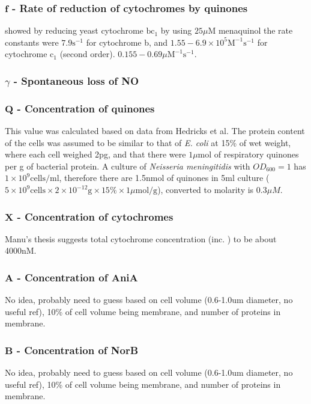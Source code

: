 \subsubsection*{$\mathbf{f}$ {\bf- Rate of reduction of cytochromes by quinones}}
\citet{Snyder2000} showed by reducing yeast cytochrome $\mathrm{bc}_1$ by using $25\mu\mathrm{M}$ menaquinol the rate constants were $7.9\mathrm{s}^{-1}$ for cytochrome b, and $1.55-6.9\times10^5\mathrm{M}^{-1}\mathrm{s}^{-1}$ for cytochrome $\mathrm{c}_1$ (second order). $0.155 - 0.69\mu\mathrm{M}^{-1}\mathrm{s}^{-1}$.

\subsubsection*{$\gamma$ {\bf- Spontaneous loss of NO}}


\subsubsection*{$\mathbf{Q}$ {\bf- Concentration of quinones}}
This value was calculated based on data from Hedricks et al\cite{Hedrick1986}. The protein content of the cells was assumed to be similar to that of \textit{E. coli} at 15\% of wet weight, where each cell weighed 2pg, and that there were $1\mu \textrm{mol}$ of respiratory quinones per g of bacterial protein. A culture of \textit{Neisseria meningitidis} with $OD_{600} = 1$ has $1 \times 10^9 \textrm{cells/ml}$, therefore there are 1.5nmol of quinones in 5ml culture ($5\times 10^9 \textrm{cells} \times 2\times 10^{-12} \textrm{g} \times 15\% \times 1\mu\textrm{mol/g}$), converted to molarity is $0.3\mu M$.

\subsubsection*{$\mathbf{X}$ {\bf- Concentration of cytochromes}}
Manu's thesis\cite{Deeudom2007} suggests total cytochrome concentration (inc. \cbbthree{}) to be about 4000nM.

\subsubsection*{$\mathbf{A}$ {\bf- Concentration of AniA}}
No idea, probably need to guess based on cell volume (0.6-1.0um diameter, no useful ref), 10\% of cell volume being membrane, and number of proteins in membrane.

\subsubsection*{$\mathbf{B}$ {\bf- Concentration of NorB}}
No idea, probably need to guess based on cell volume (0.6-1.0um diameter, no useful ref), 10\% of cell volume being membrane, and number of proteins in membrane.

